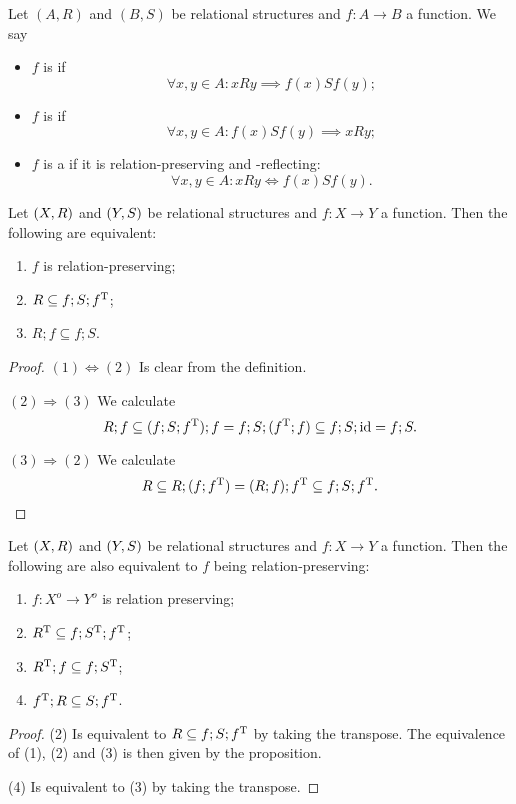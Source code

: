 \begin{definition}
Let $(A, R)$ and $(B, S)$ be relational structures and $f: A\to B$ a function. We say
\begin{itemize}
\item $f$ is  if
\[ \forall x,y\in A: xRy \implies f(x)Sf(y); \]
\item $f$ is  if
\[ \forall x,y\in A: f(x)Sf(y) \implies xRy; \]
\item $f$ is a  if it is relation-preserving and -reflecting:
\[ \forall x,y\in A: xRy \iff f(x)Sf(y). \]
\end{itemize}
\end{definition}

\begin{proposition} \label{relationPreserving}
Let $\sSet{X, R}$ and $\sSet{Y, S}$ be relational structures and $f: X\to Y$ a function. Then the following are equivalent:
\begin{enumerate}
\item $f$ is relation-preserving;
\item $R \subseteq f;S;f^{\mathrm{T}}$;
\item $R;f \subseteq f;S$.
\end{enumerate}
\end{proposition}
\begin{proof}
$(1) \Leftrightarrow (2)$ Is clear from the definition.

$(2) \Rightarrow (3)$ We calculate
\[ R;f \subseteq (f;S;f^{\mathrm{T}});f = f;S;(f^{\mathrm{T}};f) \subseteq f;S;\operatorname{id} = f;S. \]

$(3) \Rightarrow (2)$ We calculate
\[ R \subseteq R;(f;f^{\mathrm{T}}) = (R;f);f^{\mathrm{T}} \subseteq f;S;f^{\mathrm{T}}. \]
\end{proof}
\begin{corollary}
Let $\sSet{X, R}$ and $\sSet{Y, S}$ be relational structures and $f: X\to Y$ a function. Then the following are also equivalent to $f$ being relation-preserving:
\begin{enumerate}
\item $f: X^o \to Y^o$ is relation preserving;
\item $R^{\mathrm{T}} \subseteq f;S^{\mathrm{T}};f^{\mathrm{T}}$;
\item $R^{\mathrm{T}};f \subseteq f;S^{\mathrm{T}}$;
\item $f^{\mathrm{T}};R \subseteq S;f^{\mathrm{T}}$.
\end{enumerate}
\end{corollary}
\begin{proof}
(2) Is equivalent to $R \subseteq f;S;f^{\mathrm{T}}$ by taking the transpose. The equivalence of (1), (2) and (3) is then given by the proposition.

(4) Is equivalent to (3) by taking the transpose.
\end{proof}
